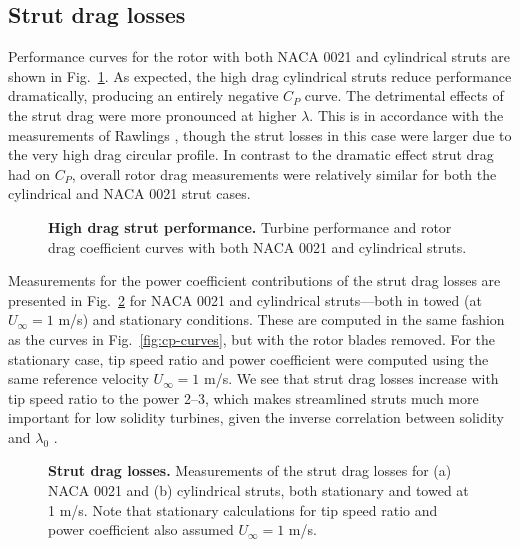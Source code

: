 \documentclass[10pt,letterpaper]{article}
\begin{document}
\subsection*{Strut drag losses}

Performance curves for the rotor with both NACA 0021 and cylindrical struts are
shown in Fig.~\ref{fig:perf-covers}. As expected, the high drag cylindrical
struts reduce performance dramatically, producing an entirely negative $C_P$
curve. The detrimental effects of the strut drag were more pronounced at higher
$\lambda$. This is in accordance with the measurements of Rawlings
\cite{Rawlings2008}, though the strut losses in this case were larger due to the
very high drag circular profile. In contrast to the dramatic effect strut drag
had on $C_P$, overall rotor drag measurements were relatively similar for both
the cylindrical and NACA 0021 strut cases.

\begin{figure}

    \caption{{\bf High drag strut performance.} Turbine performance and rotor
        drag coefficient curves with both NACA 0021 and cylindrical struts.}

    \label{fig:perf-covers}
\end{figure}

Measurements for the power coefficient contributions of the strut drag losses
are presented in Fig.~\ref{fig:no-blades} for NACA 0021 and cylindrical
struts---both in towed (at $U_\infty=1$ m/s) and stationary conditions. These
are computed in the same fashion as the curves in Fig.~\ref{fig:cp-curves}, but
with the rotor blades removed. For the stationary case, tip speed ratio and
power coefficient were computed using the same reference velocity $U_\infty=1$
m/s. We see that strut drag losses increase with tip speed ratio to the power
2--3, which makes streamlined struts much more important for low solidity
turbines, given the inverse correlation between solidity and $\lambda_0$
\cite{Templin1974}.

\begin{figure}

    \caption{{\bf Strut drag losses.} Measurements of the strut drag losses for
    (a) NACA 0021 and (b) cylindrical struts, both stationary and towed at 1
    m/s. Note that stationary calculations for tip speed ratio and power
    coefficient also assumed $U_\infty = 1$ m/s.}

    \label{fig:no-blades}
\end{figure}
\end{document}

